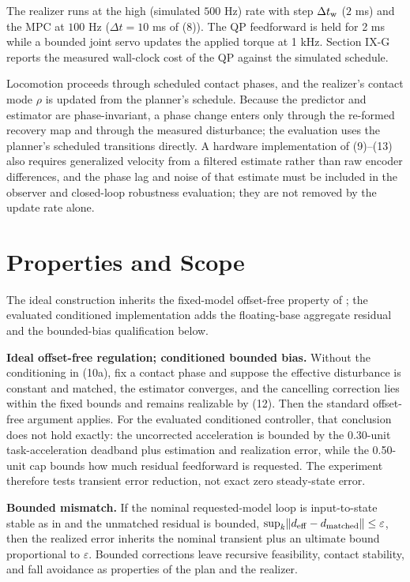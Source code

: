 \documentclass[journal]{IEEEtran}
\theoremstyle{plain}
\theoremstyle{definition}
\begin{document}
The realizer runs at the high (simulated \(500\) Hz) rate with step \(\Delta t_{\rm w}\) (\(2\) ms) and the MPC at \(100\) Hz (\(\Delta t=10\) ms of (8)). The QP feedforward is held for 2 ms while a bounded joint servo updates the applied torque at 1 kHz. Section IX-G reports the measured wall-clock cost of the QP against the simulated schedule.

Locomotion proceeds through scheduled contact phases, and the realizer's contact mode \(\rho\) is updated from the planner's schedule. Because the predictor and estimator are phase-invariant, a phase change enters only through the re-formed recovery map and through the measured disturbance; the evaluation uses the planner's scheduled transitions directly. A hardware implementation of (9)--(13) also requires generalized velocity from a filtered estimate rather than raw encoder differences, and the phase lag and noise of that estimate must be included in the observer and closed-loop robustness evaluation; they are not removed by the update rate alone.

\section{Properties and Scope}\label{sec:properties}

The ideal construction inherits the fixed-model offset-free property of \cite{ref1}; the evaluated conditioned implementation adds the floating-base aggregate residual and the bounded-bias qualification below.

\textbf{Ideal offset-free regulation; conditioned bounded bias.} Without the conditioning in (10a), fix a contact phase and suppose the effective disturbance is constant and matched, the estimator converges, and the cancelling correction lies within the fixed bounds and remains realizable by (12). Then the standard offset-free argument applies. For the evaluated conditioned controller, that conclusion does not hold exactly: the uncorrected acceleration is bounded by the 0.30-unit task-acceleration deadband plus estimation and realization error, while the 0.50-unit cap bounds how much residual feedforward is requested. The experiment therefore tests transient error reduction, not exact zero steady-state error.

\textbf{Bounded mismatch.} If the nominal requested-model loop is input-to-state stable as in \cite{ref1} and the unmatched residual is bounded, \(\sup_k\lVert d_{\rm eff}-d_{\rm matched}\rVert\le\varepsilon\), then the realized error inherits the nominal transient plus an ultimate bound proportional to \(\varepsilon\). Bounded corrections leave recursive feasibility, contact stability, and fall avoidance as properties of the plan and the realizer.
\end{document}
